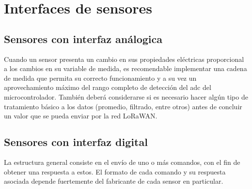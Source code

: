 \section{Interfaces de sensores}

\subsection{Sensores con interfaz análogica}

Cuando un sensor presenta un cambio en sus propiedades eléctricas proporcional a los cambios en su variable de medida, es recomendable implementar una cadena de medida que permita su correcto funcionamiento y a su vez un aprovechamiento máximo del rango completo de detección del \gls{adc} del microcontrolador. También deberá considerarse si es necesario hacer algún tipo de tratamiento básico a los datos (promedio, filtrado, entre otros) antes de concluir un valor que se pueda enviar por la red LoRaWAN.

\subsection{Sensores con interfaz digital}

La estructura general consiste en el envío de uno o más comandos, con el fin de obtener una respuesta a estos. El formato de cada comando y su respuesta asociada depende fuertemente del fabricante de cada sensor en particular.
